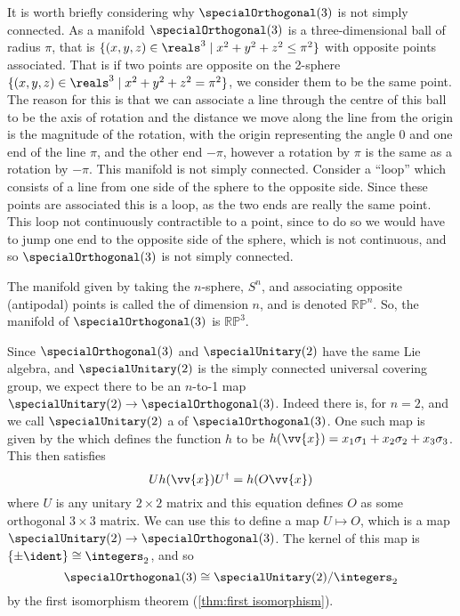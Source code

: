 It is worth briefly considering why \(\specialOrthogonal(3)\) is not simply connected.
As a manifold \(\specialOrthogonal(3)\) is a three-dimensional ball of radius \(\pi\), that is \(\{(x, y, z) \in \reals^3 \mid x^2 + y^2 + z^2 \le \pi^2\}\) with opposite points associated.
That is if two points are opposite on the 2-sphere \(\{(x, y, z) \in \reals^3 \mid x^2 + y^2 + z^2 = \pi^2\}\), we consider them to be the same point.
The reason for this is that we can associate a line through the centre of this ball to be the axis of rotation and the distance we move along the line from the origin is the magnitude of the rotation, with the origin representing the angle 0 and one end of the line \(\pi\), and the other end \(-\pi\), however a rotation by \(\pi\) is the same as a rotation by \(-\pi\).
This manifold is not simply connected.
Consider a \enquote{loop} which consists of a line from one side of the sphere to the opposite side.
Since these points are associated this is a loop, as the two ends are really the same point.
This loop not continuously contractible to a point, since to do so we would have to jump one end to the opposite side of the sphere, which is not continuous, and so \(\specialOrthogonal(3)\) is not simply connected.

The manifold given by taking the \(n\)-sphere, \(S^n\), and associating opposite (antipodal) points is called the  of dimension \(n\), and is denoted \(\mathbb{RP}^n\).
So, the manifold of \(\specialOrthogonal(3)\) is \(\mathbb{RP}^3\).

Since \(\specialOrthogonal(3)\) and \(\specialUnitary(2)\) have the same Lie algebra, and \(\specialUnitary(2)\) is the simply connected universal covering group, we expect there to be an \(n\)-to-1 map \(\specialUnitary(2) \to \specialOrthogonal(3)\).
Indeed there is, for \(n = 2\), and we call \(\specialUnitary(2)\) a  of \(\specialOrthogonal(3)\).
One such map is given by the  which defines the function \(h\) to be \(h(\vv{x}) = x_1\sigma_1 + x_2\sigma_2 + x_3\sigma_3\).
This then satisfies
\begin{equation}
    Uh(\vv{x})U^\hermit = h(O\vv{x})
\end{equation}
where \(U\) is any unitary \(2\times 2\) matrix and this equation defines \(O\) as some orthogonal \(3\times 3\) matrix.
We can use this to define a map \(U \mapsto O\), which is a map \(\specialUnitary(2) \to \specialOrthogonal(3)\).
The kernel of this map is \(\{\pm \ident\} \isomorphic \integers_2\), and so
\begin{equation}
    \specialOrthogonal(3) \isomorphic \specialUnitary(2) / \integers_2
\end{equation}
by the first isomorphism theorem (\cref{thm:first isomorphism}).

